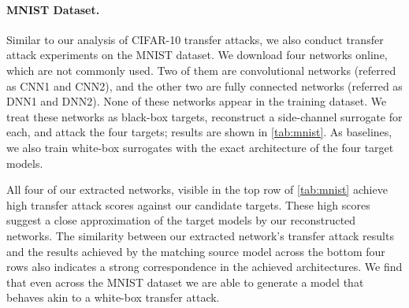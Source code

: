 \documentclass[12pt]{report}
\begin{document}
\paragraph{MNIST Dataset.}
Similar to our analysis of CIFAR-10 transfer attacks, 
we also conduct transfer attack experiments on the MNIST dataset. 
We download four networks online, which are not commonly used.
Two of them are convolutional networks (referred as CNN1 and CNN2), and 
the other two are fully connected networks (referred as DNN1 and DNN2).
None of these networks appear in the training dataset.
We treat these networks as black-box targets, reconstruct a side-channel surrogate for each, and attack the four targets; results are shown in \ref{tab:mnist}.
As baselines, we also train white-box surrogates with the exact architecture of the four target models.


All four of our extracted networks, visible in the top row of \ref{tab:mnist} achieve high
transfer attack scores against our candidate targets.
These high scores suggest a close approximation of the target models by our reconstructed networks.
The similarity between our extracted network's transfer attack results and the results achieved
by the matching source model across the bottom four rows also indicates a strong correspondence
in the achieved architectures.
We find that even across the MNIST dataset we are able to generate a model that behaves akin to
a white-box transfer attack.


\vspace{-2mm}
\begin{table}[t]
\centering
\caption{Transfer attack results on MNIST. }\label{tab:mnist}
\end{table}
\end{document}
